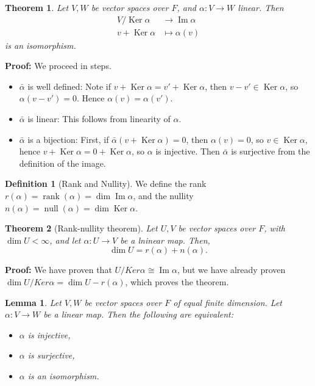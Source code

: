 \documentclass[12pt]{article}
\DeclareMathOperator{\Ker}{Ker}
\DeclareMathOperator{\Img}{Im}
\DeclareMathOperator{\rank}{rank}
\DeclareMathOperator{\nullity}{null}
\newtheorem{theorem}{Theorem}[section]
\newtheorem{lemma}{Lemma}[section]
\theoremstyle{definition}
\newtheorem{definition}{Definition}[section]
\theoremstyle{remark}
\begin{document}
\begin{theorem}
	Let $V, W$ be vector spaces over $F$, and $\alpha : V \to W$ linear. Then
	\begin{align*}
		V/\Ker \alpha &\to \Img \alpha \\
		v + \Ker \alpha &\mapsto \alpha(v)
	\end{align*}
	is an isomorphism.
\end{theorem}

\begin{adjustbox}{minipage = \columnwidth - 25.5pt, margin=1em, frame=1pt, margin=0em}
\textbf{Proof:} We proceed in steps.
\begin{itemize}
	\item $\bar \alpha$ is well defined: Note if $v + \Ker \alpha = v' + \Ker \alpha$, then $v - v' \in \Ker \alpha$, so $\alpha(v - v') = 0$. Hence $\alpha(v) = \alpha(v')$.
	\item $\bar \alpha$ is linear: This follows from linearity of $\alpha$.
	\item $\bar \alpha$ is a bijection: First, if $\bar \alpha (v + \Ker \alpha) = 0$, then $\alpha(v) = 0$, so $v \in \Ker \alpha$, hence $v + \Ker \alpha = 0 + \Ker \alpha$, so $\alpha$ is injective. Then $\bar \alpha$ is surjective from the definition of the image.
\end{itemize}

\end{adjustbox}

\begin{definition}[Rank and Nullity]
	We define the rank $r(\alpha) = \rank(\alpha) = \dim \Img \alpha$, and the nullity $n(\alpha) = \nullity(\alpha) = \dim \Ker \alpha$.
\end{definition}

\begin{theorem}[Rank-nullity theorem]
	Let $U, V$ be vector spaces over $F$, with $\dim U < \infty$, and let $\alpha : U \to V$ be a lninear map. Then,
	\[
		\dim U = r(\alpha) + n(\alpha)
	.\]
\end{theorem}

\begin{adjustbox}{minipage = \columnwidth - 25.5pt, margin=1em, frame=1pt, margin=0em}
	\textbf{Proof:} We have proven that $U/Ker \alpha \cong \Img \alpha$, but we have already proven $\dim U/Ker \alpha = \dim U - r(\alpha)$, which proves the theorem.
\end{adjustbox}

\begin{lemma}
	Let $V, W$ be vector spaces over $F$ of equal finite dimension. Let $\alpha : V \to W$ be a linear map. Then the following are equivalent:
	\begin{itemize}
		\item $\alpha$ is injective,
		\item $\alpha$ is surjective,
		\item $\alpha$ is an isomorphism.
	\end{itemize}
\end{lemma}
\end{document}
